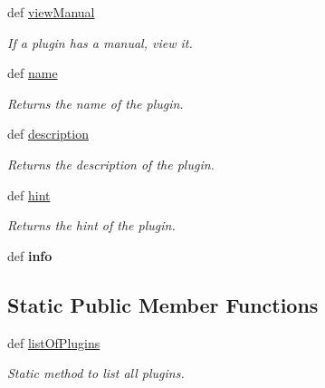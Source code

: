 \begin{DoxyCompactItemize}
\item 
def \hyperlink{classpython_1_1telplugins_1_1_plugin_a99dc50fd956142906ac7106651e6ace7}{view\-Manual}
\begin{DoxyCompactList}\small\item\em If a plugin has a manual, view it. \end{DoxyCompactList}\item 
def \hyperlink{classpython_1_1telplugins_1_1_plugin_a0cb4a44fda678bd2057ab99208a355bb}{name}
\begin{DoxyCompactList}\small\item\em Returns the name of the plugin. \end{DoxyCompactList}\item 
def \hyperlink{classpython_1_1telplugins_1_1_plugin_a2358ed8d643666b29b97047dd762dccb}{description}
\begin{DoxyCompactList}\small\item\em Returns the description of the plugin. \end{DoxyCompactList}\item 
def \hyperlink{classpython_1_1telplugins_1_1_plugin_a642879901179a21744afed441590f813}{hint}
\begin{DoxyCompactList}\small\item\em Returns the hint of the plugin. \end{DoxyCompactList}\item 
\hypertarget{classpython_1_1telplugins_1_1_plugin_af711f0571a86bf4dcd598b5ed8455a98}{def {\bfseries info}}\label{classpython_1_1telplugins_1_1_plugin_af711f0571a86bf4dcd598b5ed8455a98}

\end{DoxyCompactItemize}
\subsection*{Static Public Member Functions}
\begin{DoxyCompactItemize}
\item 
def \hyperlink{classpython_1_1telplugins_1_1_plugin_a3a980445c8df1cb8441167ded08af590}{list\-Of\-Plugins}
\begin{DoxyCompactList}\small\item\em Static method to list all plugins. \end{DoxyCompactList}\end{DoxyCompactItemize}
